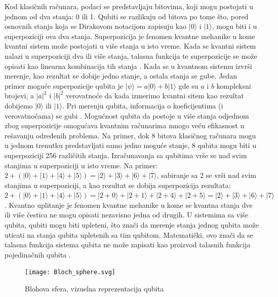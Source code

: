 \documentclass[fleqn, 12pt]{article}
\begin{document}
\begin{text}
Kod klasičnih računara, podaci se predstavljaju bitovima, koji mogu postojati u jednom od dva stanja: 0 ili 1. Qubiti se razlikuju od bitova po tome što, pored osnovnih stanja koja se Dirakovom notacijom zapisuju kao \(|0\rangle\) i \(|1\rangle\), mogu biti i u superpoziciji ova dva stanja. Superpozicija je fenomen kvantne mehanike u kome kvantni sistem može postojati u više stanja u isto vreme. Kada se kvantni sistem nalazi u superpoziciji dva ili više stanja, talasna funkcija te superpozicije se može opisati kao linearna kombinacija tih stanja \cite{G1}. Kada se u kvantnom sistemu izvrši merenje, kao rezultat se dobije jedno stanje, a ostala stanja se gube. Jedan primer moguće superpozicije qubita je \(|\psi\rangle = a|0\rangle + b|1\rangle\) gde su \(a\) i \(b\) kompleksni brojevi, a \(|a|^2\) i \(|b|^2\) verovatnoće da kada izmerimo kvantni sitem kao rezultat dobijemo \(|0\rangle\) ili \(|1\rangle\). Pri merenju qubita, informacija o koeficijentima (i verovatnoćama) se gubi \cite{G1}. Mogućnost qubita da postoje u više stanja odjednom zbog superpozicije omogućava kvantnim računarima mnogo veću efikasnost u rešavanju određenih problema. Na primer, dok 8 bitova klasičnog računara mogu u jednom trenutku predstavljati samo jedno moguće stanje, 8 qubita mogu biti u superpoziciji 256 različitih stanja. Izračunavanja sa qubitima vrše se nad svim stanjima u superpoziciji u isto vreme. Na primer: \(2 + (|0\rangle + |1\rangle + |4\rangle + |5\rangle) = |2\rangle + |3\rangle + |6\rangle + |7\rangle\), sabiranje sa \(2\) se vrši nad svim stanjima u superpoziciji, a kao rezultat se dobija superpozicija rezultata: \(2 + (|0\rangle + |1\rangle + |4\rangle + |5\rangle) =  |2 + 0\rangle + |2 + 1\rangle + |2 + 4\rangle + |2 + 5\rangle =  |2\rangle + |3\rangle + |6\rangle + |7\rangle\). Kvantno uplitanje je fenomen kvantne mehanike u kome se kvantna stanja dve ili više čestica ne mogu opisati nezavisno jedna od drugih. U sistemima sa više qubita, qubiti mogu biti upleteni, što znači da merenje stanja jednog qubita može uticati na stanja qubita upletenih sa tim qubitom. Matematički, ovo znači da se talasna funkcija sistema qubita ne može zapisati kao proizvod talasnih funkcija pojedinačnih qubita \cite{G1}.
\end{text}

\begin{figure}[h!]
    \centering
    \texttt{[image: Bloch\_sphere.svg]}
    \caption{Blohova sfera, vizuelna reprezentacija qubita}
\end{figure}
\end{document}
